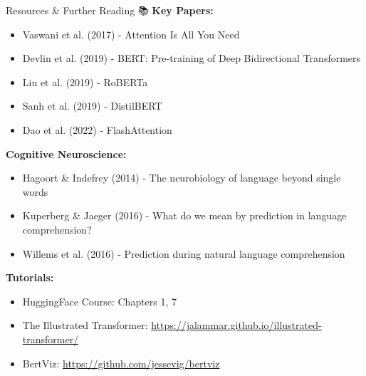 \documentclass[aspectratio=169]{beamer}
\begin{document}
\begin{frame}[shrink=10]{Resources \& Further Reading 📚}
\textbf{Key Papers:}
\begin{itemize}\setlength{\itemsep}{0pt}
    \item Vaswani et al. (2017) - Attention Is All You Need
    \item Devlin et al. (2019) - BERT: Pre-training of Deep Bidirectional Transformers
    \item Liu et al. (2019) - RoBERTa
    \item Sanh et al. (2019) - DistilBERT
    \item Dao et al. (2022) - FlashAttention
\end{itemize}

\vspace{0.5em}

\textbf{Cognitive Neuroscience:}
\begin{itemize}\setlength{\itemsep}{0pt}
    \item Hagoort \& Indefrey (2014) - The neurobiology of language beyond single words
    \item Kuperberg \& Jaeger (2016) - What do we mean by prediction in language comprehension?
    \item Willems et al. (2016) - Prediction during natural language comprehension
\end{itemize}

\vspace{0.5em}

\textbf{Tutorials:}
\begin{itemize}\setlength{\itemsep}{0pt}
    \item HuggingFace Course: Chapters 1, 7
    \item The Illustrated Transformer: \url{https://jalammar.github.io/illustrated-transformer/}
    \item BertViz: \url{https://github.com/jessevig/bertviz}
\end{itemize}
\end{frame}
\end{document}
